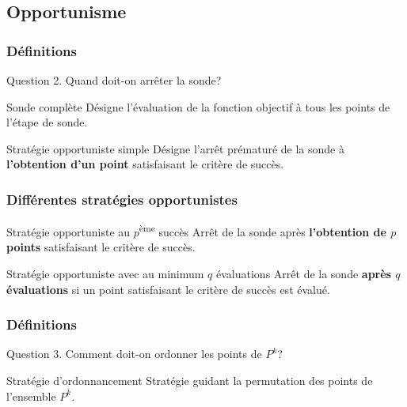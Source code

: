 \documentclass{beamer}
\begin{document}
\subsection{Opportunisme}
\begin{frame}
\frametitle{Définitions}
\begin{exampleblock}{Question 2.}
Quand doit-on arrêter la sonde?
\end{exampleblock}
\pause
\bigskip

\pause
\bigskip

{\begin{block}{Sonde complète}
Désigne l'évaluation de la fonction objectif à tous les points de l'étape de sonde.
\end{block}}
\pause
\bigskip

\begin{block}{Stratégie opportuniste simple}
	Désigne l'arrêt prématuré de la sonde à \textbf{l'obtention d'un point} satisfaisant le critère de succès. 
\end{block}
\end{frame}
\begin{frame}
\frametitle{Différentes stratégies opportunistes}

\begin{block}{Stratégie opportuniste au $p$\textsuperscript{ème} succès}
Arrêt de la sonde après \textbf{l'obtention de $p$ points} satisfaisant le critère de succès.\end{block}
\pause
\medskip

{\begin{block}{Stratégie opportuniste avec au minimum $q$ évaluations}
Arrêt de la sonde \textbf{après $q$ évaluations} si un point satisfaisant le critère de succès est évalué. \end{block}}
\end{frame}

\begin{frame}
\frametitle{Définitions}
\begin{exampleblock}{Question 3.}
Comment doit-on ordonner les points de $P^k$?
\end{exampleblock}
\pause
\bigskip

{\begin{block}{Stratégie d'ordonnancement}
Stratégie guidant la permutation des points de l'ensemble $P^k$.
\end{block}}
\end{frame}
\end{document}
